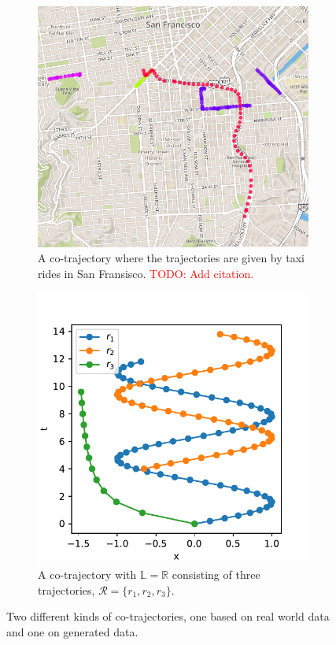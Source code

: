 \documentclass[12pt]{article}
\newcommand{\todo}[1]{\textcolor{red}{#1}}
\newcommand{\R}{\mathbb{R}}
\newcommand{\traj}{r}
\newcommand{\cotraj}{\mathcal{R}}
\newcommand{\locset}{\mathbb{L}}
\theoremstyle{definition}
\begin{document}
\begin{figure}
  \centering
  \begin{subfigure}[t]{0.49\textwidth}
    \includegraphics[width=\textwidth]{figures/co-trajectory-taxi.png}
    \caption{A co-trajectory where the trajectories are given by taxi
      rides in San Fransisco. \todo{TODO: Add citation.}}
    \label{fig:co-trajectory-taxi}
  \end{subfigure}
  \begin{subfigure}[t]{0.49\textwidth}
    \includegraphics[width=\textwidth]{figures/co-trajectory-abstract.pdf}
    \caption{A co-trajectory with \(\locset = \R\) consisting of three
      trajectories, \(\cotraj = \{\traj_{1}, \traj_{2}, \traj_{3}\}\).}
    \label{fig:co-trajectory-abstract}
  \end{subfigure}
  \caption{Two different kinds of co-trajectories, one based on real
    world data and one on generated data.}
  \label{fig:co-trajectory}
\end{figure}
\end{document}
